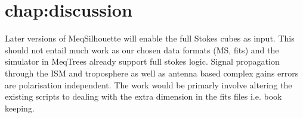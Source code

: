 \chapter{chap:discussion}
Later versions of {\sc MeqSilhouette} will enable the full Stokes cubes as input. This should not entail much work as our chosen data formats (MS, {\sc fits}) and the simulator in {\sc MeqTrees} already support full stokes logic. Signal propagation through the ISM and troposphere as well as antenna based complex gains errors are polarisation independent. The work would be primarly involve altering the existing scripts to dealing with the extra dimension in the {\sc fits} files i.e. book keeping.   

